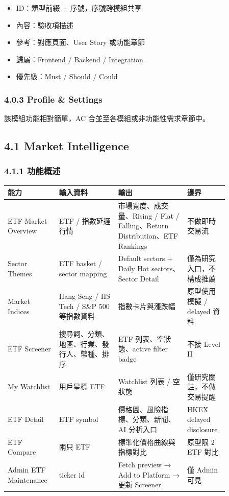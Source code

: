\begin{itemize}
\item ID：類型前綴 + 序號，序號跨模組共享
\item 內容：驗收項描述
\item 參考：對應頁面、User Story 或功能章節
\item 歸屬：Frontend / Backend / Integration
\item 優先級：Must / Should / Could
\end{itemize}

\subsubsection{4.0.3 Profile \& Settings}

該模組功能相對簡單，AC 合並至各模組或非功能性需求章節中。

\subsection{4.1 Market Intelligence}

\subsubsection{4.1.1 功能概述}

\begingroup
\small
\begin{longtable}{L{0.18\linewidth}L{0.24\linewidth}L{0.28\linewidth}L{0.16\linewidth}}
\toprule
\textbf{能力} & \textbf{輸入資料} & \textbf{輸出} & \textbf{邊界} \\
\midrule
ETF Market Overview & ETF / 指數延遲行情 & 市場寬度、成交量、Rising / Flat / Falling、Return Distribution、ETF Rankings & 不做即時交易流 \\
Sector Themes & ETF basket / sector mapping & Default sectors + Daily Hot sectors、Sector Detail & 僅為研究入口，不構成推薦 \\
Market Indices & Hang Seng / HS Tech / S\&P 500 等指數資料 & 指數卡片與漲跌幅 & 原型使用模擬 / delayed 資料 \\
ETF Screener & 搜尋詞、分類、地區、行業、發行人、幣種、排序 & ETF 列表、空狀態、active filter badge & 不接 Level II \\
My Watchlist & 用戶星標 ETF & Watchlist 列表 / 空狀態 & 僅研究關註，不做交易提醒 \\
ETF Detail & ETF symbol & 價格圖、風險指標、分類、新聞、AI 分析入口 & HKEX delayed disclosure \\
ETF Compare & 兩只 ETF & 標準化價格曲線與指標對比 & 原型限 2 ETF 對比 \\
Admin ETF Maintenance & ticker id & Fetch preview → Add to Platform → 更新 Screener & 僅 Admin 可見 \\
\bottomrule
\end{longtable}
\endgroup

